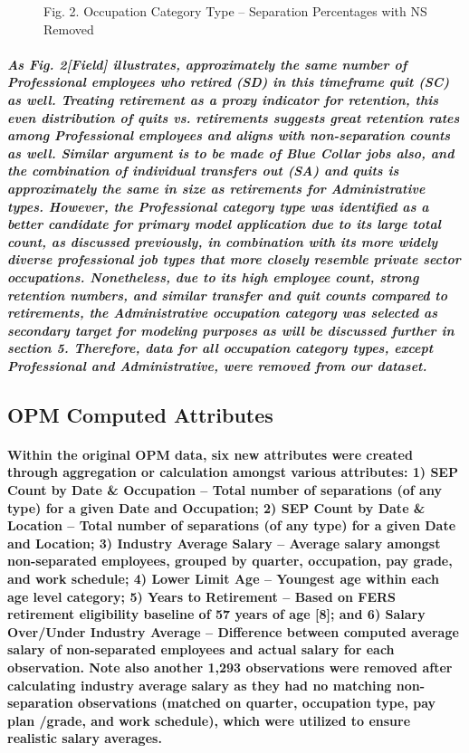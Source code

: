 \documentclass{article}
\begin{document}
\begin{figure}
\caption{Fig. 2. Occupation Category Type – Separation Percentages with NS Removed}
\end{figure}
 
\subparagraph{As Fig. 2[Field] illustrates, approximately the same number of Professional employees who retired (SD) in this timeframe quit (SC) as well. Treating retirement as a proxy indicator for retention, this even distribution of quits vs. retirements suggests great retention rates among Professional employees and aligns with non-separation counts as well. Similar argument is to be made of Blue Collar jobs also, and the combination of individual transfers out (SA) and quits is approximately the same in size as retirements for Administrative types. However, the Professional category type was identified as a better candidate for primary model application due to its large total count, as discussed previously, in combination with its more widely diverse professional job types that more closely resemble private sector occupations. Nonetheless, due to its high employee count, strong retention numbers, and similar transfer and quit counts compared to retirements, the Administrative occupation category was selected as secondary target for modeling purposes as will be discussed further in section 5. Therefore, data for all occupation category types, except Professional and Administrative, were removed from our dataset.} 
 
 
\subsection{OPM Computed Attributes}

\paragraph{Within the original OPM data, six new attributes were created through aggregation or calculation amongst various attributes: 1) SEP Count by Date \& Occupation – Total number of separations (of any type) for a given Date and Occupation; 2) SEP Count by Date \& Location – Total number of separations (of any type) for a given Date and Location; 3) Industry Average Salary – Average salary amongst non-separated employees, grouped by quarter, occupation, pay grade, and work schedule; 4) Lower Limit Age – Youngest age within each age level category; 5) Years to Retirement – Based on FERS retirement eligibility baseline of 57 years of age [8]; and 6) Salary Over/Under Industry Average – Difference between computed average salary of non-separated employees and actual salary for each observation. Note also another 1,293 observations were removed after calculating industry average salary as they had no matching non-separation observations (matched on quarter, occupation type, pay plan /grade, and work schedule), which were utilized to ensure realistic salary averages.}
 
\end{document}
